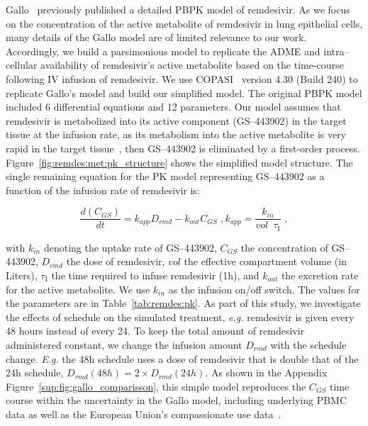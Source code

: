Gallo~\cite{gallo_hybrid_2021} previously published a detailed PBPK model of remdesivir. As we focus on the concentration of the active metabolite of remdesivir in lung epithelial cells, many details of the Gallo model are of limited relevance to our work. Accordingly, we build a parsimonious model to replicate the ADME and intra--cellular availability of remdesivir's active metabolite based on the time-course following IV infusion of remdesivir. We use COPASI~\cite{hoops_copasicomplex_2006} version 4.30 (Build 240) to replicate Gallo's model and build our simplified model. The original PBPK model included 6 differential equations and 12 parameters. Our model assumes that remdesivir is metabolized into its active component (GS--443902) in the target tissue at the infusion rate, as its metabolism into the active metabolite is very rapid in the target tissue~\cite{eastman_remdesivir_2020}, then GS--443902 is eliminated by a first-order process.  Figure~\ref{fig:remdes:met:pk_structure} shows the simplified model structure. The single remaining equation for the PK model representing GS--443902 as a function of the infusion rate of remdesivir is:

\begin{subequations}\label{eq:remdes:pk:gs_conc}
\begin{equation}\label{eq:remdes:pk:gs_conc:a}
\frac{d\left(C_{GS}\right)}{dt} = k_{app} D_{rmd} - k_{out} C_{GS}\,\,,
\end{equation}

\begin{equation}\label{eq:remdes:pk:gs_conc:b}
    k_{app} = \frac{k_{in}}{vol\,\,\,\tau_{\mathrm{I}}}\,\,,%
\end{equation}
\end{subequations}


\noindent
with $k_{in}$ denoting the uptake rate of GS--443902, $C_{GS}$ the concentration of GS--443902, $D_{rmd}$ the dose of remdesivir, $vol$ the effective compartment volume (in Liters), $\tau_{\mathrm{I}}$ the time required to infuse remdesivir (1h), and $k_{out}$ the excretion rate for the active metabolite. We use $k_{in}$ as the infusion on/off switch. The values for the parameters are in Table~\ref{tab:remdes:pk}. As part of this study, we investigate the effects of schedule on the simulated treatment, \emph{e.g.} remdesivir is given every 48 hours instead of every 24. To keep the total amount of remdesivir administered constant, we change the infusion amount $D_{rmd}$ with the schedule change. \emph{E.g.} the 48h schedule uses a dose of remdesivir that is double that of the 24h schedule, $D_{rmd}(48h) = 2\times D_{rmd}(24h)$. As shown in the Appendix Figure~\ref{sup:fig:gallo_comparisson}, this simple model reproduces the $C_{GS}$ time course within the uncertainty in the Gallo model, including underlying PBMC data as well as the European Union’s compassionate use data~\cite{european_medicines_agency_summary_2020}.


